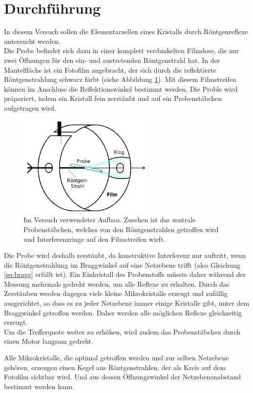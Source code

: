 \section{Durchführung}
In diesem Versuch sollen die Elementarzellen eines Kristalls durch Röntgenreflexe untersucht werden.\\
Die Probe befindet sich dazu in einer komplett verdunkelten Filmdose, die nur zwei Öffnungen für den ein- und austretenden Röntgenstrahl hat. In der Mantelfläche ist ein Fotofilm angebracht, der sich durch die reflektierte Röntgenstrahlung schwarz färbt (siehe Abbildung \ref{pic:aufbau}). Mit diesem Filmstreifen können im Anschluss die Reflektionswinkel bestimmt werden. 
Die Proble wird präpariert, indem ein Kristall fein zerstäubt und auf ein Probenstäbchen aufgetragen wird.
\begin{figure}[htbp]
	\includegraphics[width=0.6\textwidth]{../pics/aufbau.png}
	\caption{Im Versuch verwendeter Aufbau. Zusehen ist das zentrale Probenstäbchen, welches von den Röntgenstrahlen getroffen wird und Interferenzringe auf den Filmstreifen wirft.}
	\label{pic:aufbau}
\end{figure}
Die Probe wird deshalb zerstäubt, da konstruktive Interferenz nur auftritt, wenn die Röntgenstrahlung im Braggwinkel auf eine Netzebene trifft (also Gleichung \ref{eq:bragg} erfüllt ist). Ein Einkristall des Probenstoffs müsste daher während der Messung mehrmals gedreht werden, um alle Reflexe zu erhalten. Durch das Zerstäuben werden dagegen viele kleine Mikrokristalle erzeugt und zufällig ausgerichtet, so dass es zu jeder Netzebene immer einige Kristalle gibt, unter dem Braggwinkel getroffen werden. Daher werden alle möglichen Reflexe gleichzeitig erzeugt.\\
Um die Trefferquote weiter zu erhöhen, wird zudem das Probenstäbchen durch einen Motor langsam gedreht. 

Alle Mikrokristalle, die optimal getroffen werden und zur selben Netzebene gehören, erzeugen einen Kegel aus Röntgenstrahlen, der als Kreis auf dem Fotofilm sichtbar wird. Und aus dessen Öffnungswinkel der Netzebenenabstand bestimmt werden kann.

